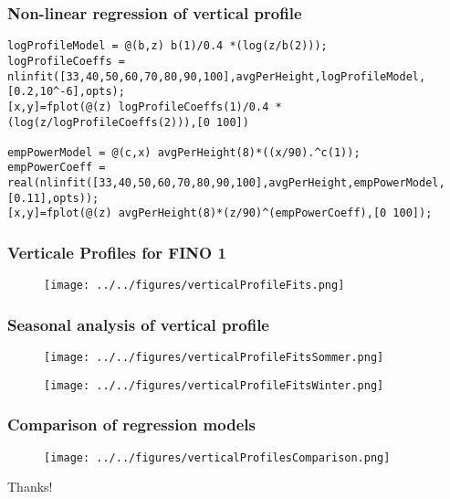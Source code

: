 \documentclass[12pt,t]{beamer}
\begin{document}
\begin{frame}[fragile]
\frametitle{Non-linear regression of vertical profile}
\vspace{40 pt}
\begin{lstlisting}
logProfileModel = @(b,z) b(1)/0.4 *(log(z/b(2)));
logProfileCoeffs = nlinfit([33,40,50,60,70,80,90,100],avgPerHeight,logProfileModel,[0.2,10^-6],opts);
[x,y]=fplot(@(z) logProfileCoeffs(1)/0.4 *(log(z/logProfileCoeffs(2))),[0 100])

empPowerModel = @(c,x) avgPerHeight(8)*((x/90).^c(1));
empPowerCoeff = real(nlinfit([33,40,50,60,70,80,90,100],avgPerHeight,empPowerModel,[0.11],opts));
[x,y]=fplot(@(z) avgPerHeight(8)*(z/90)^(empPowerCoeff),[0 100]);
\end{lstlisting}
\end{frame}

\begin{frame}[fragile]
\frametitle{Verticale Profiles for FINO 1}
\begin{figure}[H]
\centering
\texttt{[image: ../../figures/verticalProfileFits.png]}
\label{fig:weatherpattern}
\end{figure}
\end{frame}


\begin{frame}[fragile]
\frametitle{Seasonal analysis of vertical profile}
\begin{figure}[htbp]
	\begin{center}
		\begin{minipage}[t]{0.49\linewidth}
			\centering
  \texttt{[image: ../../figures/verticalProfileFitsSommer.png]}
			\label{histo1}
		\end{minipage}
		\begin{minipage}[t]{0.49\linewidth}
		  \centering
  \texttt{[image: ../../figures/verticalProfileFitsWinter.png]}
			\label{histo2}
		\end{minipage}
	\end{center}
\end{figure}
\end{frame}

\begin{frame}[fragile]
\frametitle{Comparison of regression models}
\begin{figure}[H]
\centering
\texttt{[image: ../../figures/verticalProfilesComparison.png]}
\label{fig:weatherpattern}
\end{figure}
\end{frame}

\begin{frame}[fragile]
\vspace{100 pt}
\Huge
\begin{center}
Thanks!
\end{center}
\end{frame}
\end{document}
